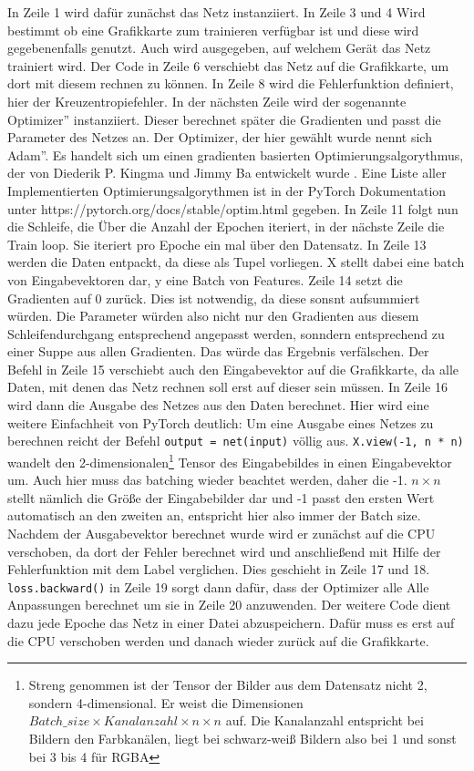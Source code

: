\documentclass{article}
\begin{document}
In Zeile 1 wird dafür zunächst das Netz instanziiert. In Zeile 3 und 4 Wird bestimmt ob eine Grafikkarte zum trainieren verfügbar ist und diese wird gegebenenfalls genutzt. Auch wird ausgegeben, auf welchem Gerät das Netz trainiert wird. Der Code in Zeile 6 verschiebt das Netz auf die Grafikkarte, um dort mit diesem rechnen zu können. In Zeile 8 wird die Fehlerfunktion definiert, hier der Kreuzentropiefehler. In der nächsten Zeile wird der sogenannte \glqq Optimizer'' instanziiert. Dieser berechnet später die Gradienten und passt die Parameter des Netzes an. Der Optimizer, der hier gewählt wurde nennt sich \glqq Adam''. Es handelt sich um einen gradienten basierten Optimierungsalgorythmus, der von Diederik P. Kingma und Jimmy Ba entwickelt wurde \cite{7}. Eine Liste aller Implementierten Optimierungsalgorythmen ist in der PyTorch Dokumentation unter https://pytorch.org/docs/stable/optim.html gegeben. In Zeile 11 folgt nun die Schleife, die Über die Anzahl der Epochen iteriert, in der nächste Zeile die Train loop. Sie iteriert pro Epoche ein mal über den Datensatz. In Zeile 13 werden die Daten entpackt, da diese als Tupel vorliegen. X stellt dabei eine batch von Eingabevektoren dar, y eine Batch von Features. Zeile 14 setzt die Gradienten auf 0 zurück. Dies ist notwendig, da diese sonsnt aufsummiert würden. Die Parameter würden also nicht nur den Gradienten aus diesem Schleifendurchgang entsprechend angepasst werden, sonndern entsprechend zu einer Suppe aus allen Gradienten. Das würde das Ergebnis verfälschen. Der Befehl in Zeile 15 verschiebt auch den Eingabevektor auf die Grafikkarte, da alle Daten, mit denen das Netz rechnen soll erst auf dieser sein müssen. In Zeile 16 wird dann die Ausgabe des Netzes aus den Daten berechnet. Hier wird eine weitere Einfachheit von PyTorch deutlich: Um eine Ausgabe eines Netzes zu berechnen reicht der Befehl \texttt{output = net(input)} völlig aus. \texttt{X.view(-1, n * n)} wandelt den 2-dimensionalen\footnote{Streng genommen ist der Tensor der Bilder aus dem Datensatz nicht 2, sondern 4-dimensional. Er weist die Dimensionen $Batch\_size\times Kanalanzahl\times n \times n$ auf. Die Kanalanzahl entspricht bei Bildern den Farbkanälen, liegt bei schwarz-weiß Bildern also bei 1 und sonst bei 3 bis 4 für RGBA} Tensor des Eingabebildes in einen Eingabevektor um. Auch hier muss das batching wieder beachtet werden, daher die -1. $n\times n$ stellt nämlich die Größe der Eingabebilder dar und -1 passt den ersten Wert automatisch an den zweiten an, entspricht hier also immer der Batch size. Nachdem der Ausgabevektor berechnet wurde wird er zunächst auf die CPU verschoben, da dort der Fehler berechnet wird und anschließend mit Hilfe der Fehlerfunktion mit dem Label verglichen. Dies geschieht in Zeile 17 und 18. \texttt{loss.backward()} in Zeile 19 sorgt dann dafür, dass der Optimizer alle Alle Anpassungen berechnet um sie in Zeile 20 anzuwenden. Der weitere Code dient dazu jede Epoche das Netz in einer Datei abzuspeichern. Dafür muss es erst auf die CPU verschoben werden und danach wieder zurück auf die Grafikkarte.
\end{document}
